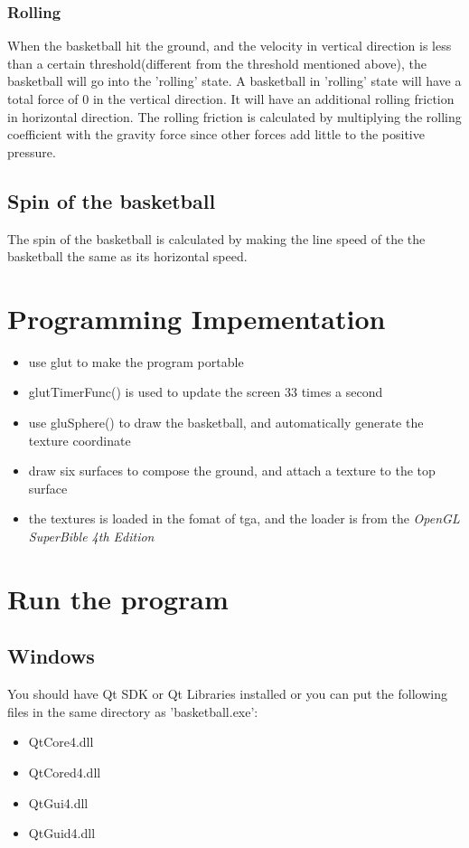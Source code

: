 \documentclass[10pt,a4paper]{article}
\begin{document}
\subsubsection{Rolling}
When the basketball hit the ground, and the velocity in vertical direction is less than a certain threshold(different from the threshold mentioned above), the basketball will go into the 'rolling' state. A basketball in 'rolling' state will have a total force of 0 in the vertical direction. It will have an additional rolling friction in horizontal direction. The rolling friction is calculated by multiplying the rolling coefficient with the gravity force since other forces add little to the positive pressure.

\subsection{Spin of the basketball}
The spin of the basketball is calculated by making the line speed of the the basketball the same as its horizontal speed. 

\section{Programming Impementation}
\begin{itemize}
\item use glut to make the program portable
\item glutTimerFunc() is used to update the screen 33 times a second
\item use gluSphere() to draw the basketball, and automatically generate the texture coordinate
\item draw six surfaces to compose the ground, and attach a texture to the top surface
\item the textures is loaded in the fomat of tga, and the loader is from the \textsl{OpenGL SuperBible 4th Edition}
\end{itemize}

\section{Run the program}
\subsection{Windows}
You should have Qt SDK or Qt Libraries installed or you can put the following files in the same directory as 'basketball.exe':
\begin{itemize}
\item QtCore4.dll
\item QtCored4.dll
\item QtGui4.dll
\item QtGuid4.dll
\end{itemize}
\end{document}
